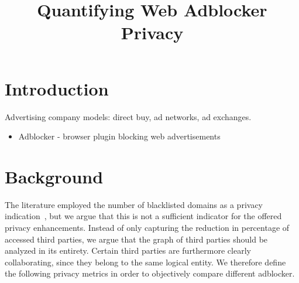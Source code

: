 \documentclass{sig-alternate}
\begin{document}
\title{Quantifying Web Adblocker Privacy}


\maketitle

\begin{abstract}
\end{abstract}

\section{Introduction} \label{sec:introduction}

Advertising company models: direct buy, ad networks, ad exchanges.

\begin{itemize}
\item Adblocker - browser plugin blocking web advertisements
\end{itemize}


\section{Background} \label{sec:background}
The literature employed the number of blacklisted domains as a privacy indication~\cite{XX}, but we argue that this is not a sufficient indicator for the offered privacy enhancements. Instead of only capturing the reduction in percentage of accessed third parties, we argue that the graph of third parties should be analyzed in its entirety. Certain third parties are furthermore clearly collaborating, since they belong to the same logical entity. We therefore define the following privacy metrics in order to objectively compare different adblocker.
\end{document}

